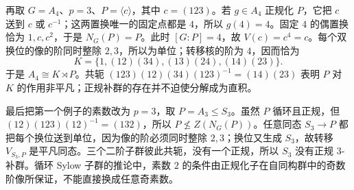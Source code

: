 \ProseParagraphBreak
再取 \(G=A_4\)、\(p=3\)、\(P=\langle c\rangle\)，其中 \(c=(123)\)。若 \(g\in A_4\) 正规化 \(P\)，它把 \(c\) 送到 \(c\) 或 \(c^{-1}\)；这两置换唯一的固定点都是 \(4\)，所以 \(g(4)=4\)。固定 \(4\) 的偶置换恰为 \(1,c,c^2\)，于是 \(N_G(P)=P\)。此时 \([G:P]=4\)，故 \(V(c)=c^4=c\)。每个双换位的像的阶同时整除 \(2,3\)，所以为单位；转移核的阶为 \(4\)，因而恰为
\[
	K=\{1,(12)(34),(13)(24),(14)(23)\}.
\]
于是 \(A_4\cong K\rtimes P\)。共轭 \((123)(12)(34)(123)^{-1}=(14)(23)\) 表明 \(P\) 对 \(K\) 的作用非平凡；正规补群的存在并不迫使分解成为直积。

\ProseParagraphBreak
最后把第一个例子的素数改为 \(p=3\)，取 \(P=A_3\leq S_3\)。虽然 \(P\) 循环且正规，但 \((12)(123)(12)^{-1}=(132)\)，所以 \(P\nleq Z(N_G(P))\)。任意同态 \(S_3\rightarrow P\) 都把每个换位送到单位，因为像的阶必须同时整除 \(2,3\)；换位又生成 \(S_3\)，故转移 \(V_{S_3,P}\) 是平凡同态。三个二阶子群彼此共轭，没有一个正规，所以 \(S_3\) 没有正规 \(3\)-补群。循环 Sylow 子群的推论中，素数 \(2\) 的条件由正规化子在自同构群中的奇数阶像所保证，不能直接换成任意奇素数。
